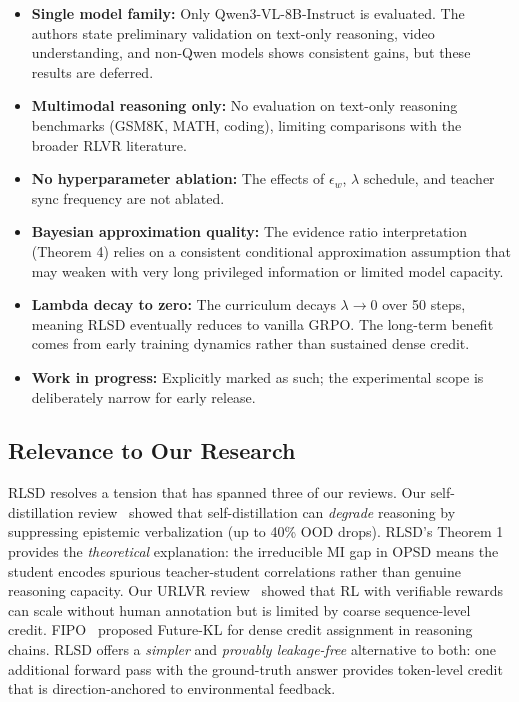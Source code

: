 \documentclass[11pt]{article}
\begin{document}
\begin{itemize}
    \item \textbf{Single model family:} Only Qwen3-VL-8B-Instruct is evaluated. The authors state preliminary validation on text-only reasoning, video understanding, and non-Qwen models shows consistent gains, but these results are deferred.
    \item \textbf{Multimodal reasoning only:} No evaluation on text-only reasoning benchmarks (GSM8K, MATH, coding), limiting comparisons with the broader RLVR literature.
    \item \textbf{No hyperparameter ablation:} The effects of $\epsilon_w$, $\lambda$ schedule, and teacher sync frequency are not ablated.
    \item \textbf{Bayesian approximation quality:} The evidence ratio interpretation (Theorem 4) relies on a consistent conditional approximation assumption that may weaken with very long privileged information or limited model capacity.
    \item \textbf{Lambda decay to zero:} The curriculum decays $\lambda \to 0$ over 50 steps, meaning RLSD eventually reduces to vanilla GRPO. The long-term benefit comes from early training dynamics rather than sustained dense credit.
    \item \textbf{Work in progress:} Explicitly marked as such; the experimental scope is deliberately narrow for early release.
\end{itemize}

\subsection{Relevance to Our Research}

RLSD resolves a tension that has spanned three of our reviews. Our self-distillation review~\cite{selfdistill} showed that self-distillation can \textit{degrade} reasoning by suppressing epistemic verbalization (up to 40\% OOD drops). RLSD's Theorem 1 provides the \textit{theoretical} explanation: the irreducible MI gap in OPSD means the student encodes spurious teacher-student correlations rather than genuine reasoning capacity. Our URLVR review~\cite{urlvr} showed that RL with verifiable rewards can scale without human annotation but is limited by coarse sequence-level credit. FIPO~\cite{fipo} proposed Future-KL for dense credit assignment in reasoning chains. RLSD offers a \textit{simpler} and \textit{provably leakage-free} alternative to both: one additional forward pass with the ground-truth answer provides token-level credit that is direction-anchored to environmental feedback.
\end{document}
